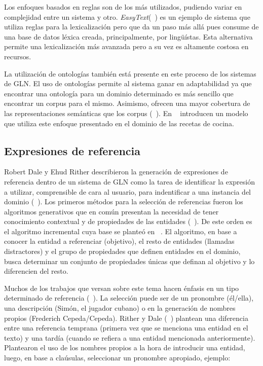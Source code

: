    Los enfoques basados en reglas son de los m\'as utilizados, pudiendo variar en complejidad entre un sistema y otro. \textit{EasyText}(~\cite{danlos2011easytext}) 
es un ejemplo de sistema que utiliza reglas para la lexicalización pero que da un paso m\'as all\'a pues consume de una base de datos 
l\'exica creada, principalmente, por lingüístas. Esta alternativa permite una lexicalización m\'as avanzada pero a su vez es altamente 
costosa en recursos.

    La utilizaci\'on de ontolog\'ias tambi\'en est\'a presente en este proceso de los sistemas de GLN. El uso de ontologías permite 
al sistema ganar en adaptabilidad ya que encontrar una ontología para un dominio determinado es más sencillo que encontrar un corpus para 
el mismo. Asimismo, ofrecen una mayor cobertura de las representaciones semánticas que los corpus (~\cite{Perera2017RecentAI}). En ~\cite{cimiano2013exploiting} introducen 
un modelo que utiliza este enfoque presentado en el dominio de las recetas de cocina.


\subsection{Expresiones de referencia}\label{subsection:expreferencia}

    Robert Dale y Ehud Rither describieron la generación de expresiones de referencia dentro de un sistema de GLN como la tarea de 
identificar la expresión a utilizar, comprensible de cara al usuario, para indentificar a una instancia del dominio (~\cite{reiter_dale_2000,Gatt2018SurveyOT}). 
Los primeros m\'etodos para la selección de referencias fueron los algoritmos generativos que en común presentan la necesidad de tener conocimiento 
contextual y de propiedades de las entidades (~\cite{Gatt2018SurveyOT}). De este orden es el algoritmo incremental cuya base se plante\'o en ~\cite{dale1995computational}. 
El algoritmo, en base a conocer la entidad a referenciar (objetivo), el resto de entidades (llamadas distractores) y el grupo de propiedades que definen entidades en el dominio,
busca determinar un conjunto de propiedades \'unicas que definan al objetivo y lo diferencien del resto.

    Muchos de los trabajos que versan sobre este tema hacen énfasis en un tipo determinado de referencia (~\cite{ferreira2018neuralreg}). La selección 
puede ser de un pronombre (\'el/ella), una descripci\'on (Sim\'on, el jugador cubano) o en la generación de nombres propios (Frederich Cepeda/Cepeda). 
Rither y Dale (~\cite{reiter_dale_2000}) plantean una diferencia entre una referencia temprana (primera vez que se menciona una 
entidad en el texto) y una tard\'ia (cuando se refiera a una entidad mencionada anteriormente). Plantearon el uso de los nombres propios a la hora 
de introducir una entidad, luego, en base a cla\'usulas, seleccionar un pronombre apropiado, ejemplo:

